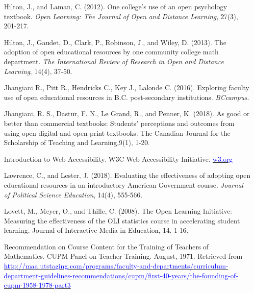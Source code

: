 \documentclass[11pt]{article}
\newcommand{\alink}[2]{\href{#1}{\textcolor{blue}{#2}}}
\begin{document}
\begin{thebibliography}{99}
   Hilton, J., and Laman, C. (2012). One college’s use of an open psychology textbook. {\em Open Learning: The Journal of Open and Distance Learning}, 27(3), 201-217.

   Hilton, J., Gaudet, D., Clark, P., Robinson, J., and Wiley, D. (2013). The adoption of open educational resources by one community college math department. {\em The International Review of Research in Open and Distance Learning}, 14(4), 37-50.

   Jhangiani R., Pitt R., Hendricks C., Key J., Lalonde C. (2016). Exploring faculty use of open educational resources in B.C. post-secondary institutions. {\em BCcampus}. %

   Jhangiani, R. S., Dastur, F. N., Le Grand, R., and Penner, K. (2018). As good or better than commercial textbooks: Students' perceptions and outcomes from using open digital and open print textbooks. The Canadian Journal for the Scholarship of Teaching and Learning,9(1), 1-20.

   Introduction to Web Accessibility.  W3C Web Accessibility Initiative. \alink{w3.org}{w3.org}%

   Lawrence, C., and Lester, J. (2018). Evaluating the effectiveness of adopting open educational resources in an introductory American Government course. {\em Journal of Political Science Education}, 14(4), 555-566.

   Lovett, M., Meyer, O., and Thille, C. (2008). The Open Learning Initiative: Measuring the effectiveness of the OLI statistics course in accelerating student learning. Journal of Interactive Media in Education, 14, 1-16.

   Recommendation on Course Content for the Training of Teachers of Mathematics. CUPM Panel on Teacher Training. August, 1971. Retrieved from \alink{http://maa.utstaging.com/programs/faculty-and-departments/curriculum-department-guidelines-recommendations/cupm/first-40-years/the-founding-of-cupm-1958-1978-part3}{http://maa.utstaging.com/programs/faculty-and-departments/curriculum-department-guidelines-recommendations/cupm/first-40-years/the-founding-of-cupm-1958-1978-part3}


\end{thebibliography}
\end{document}
